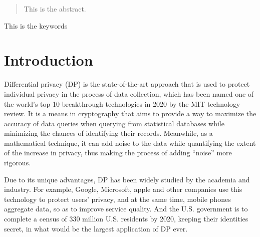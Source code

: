 \documentclass[conference]{IEEEtran}
\begin{document}
\begin{abstract}
This is the abstract.
\end{abstract}

\begin{IEEEkeywords}
This is the keywords
\end{IEEEkeywords}

\section{Introduction}
Differential privacy (DP)\cite{a7} is the state-of-the-art approach that is used to protect individual privacy in the process of data collection, which has been named one of the world's top 10 breakthrough technologies in 2020 by the MIT technology review. It is a means in cryptography that aims to provide a way to maximize the accuracy of data queries when querying from statistical databases while minimizing the chances of identifying their records. Meanwhile, as a mathematical technique, it can add noise to the data while quantifying the extent of the increase in privacy, thus making the process of adding ``noise'' more rigorous.

Due to its unique advantages, DP has been widely studied by the academia and industry. For example, Google, Microsoft, apple and other companies use this technology to protect users' privacy, and at the same time, mobile phones aggregate data, so as to improve service quality. And the U.S. government is to complete a census of 330 million U.S. residents by 2020, keeping their identities secret, in what would be the largest application of DP ever.
\end{document}
